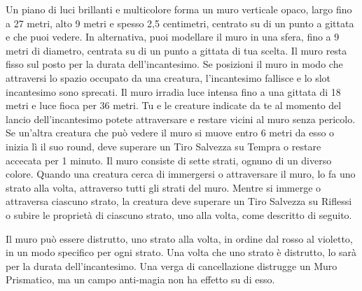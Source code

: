 \begin{multicols}{2}
Un piano di luci brillanti e multicolore forma un muro verticale opaco, largo fino a 27 metri, alto 9 metri e spesso 2,5 centimetri, centrato su di un punto a gittata e che puoi vedere. In alternativa, puoi modellare il muro in una sfera, fino a 9 metri di diametro, centrata su di un punto a gittata di tua scelta. Il muro resta fisso sul posto per la durata dell'incantesimo. Se posizioni il muro in modo che attraversi lo spazio occupato da una creatura, l'incantesimo fallisce e lo slot incantesimo sono sprecati. Il muro irradia luce intensa fino a una gittata di 18 metri e luce fioca per 36 metri. Tu e le creature indicate da te al momento del lancio dell'incantesimo potete attraversare e restare vicini al muro senza pericolo. Se un'altra creatura che può vedere il muro si muove entro 6 metri da esso o inizia lì il suo round, deve superare un Tiro Salvezza su Tempra o restare accecata per 1 minuto. Il muro consiste di sette strati, ognuno di un diverso colore. Quando una creatura cerca di immergersi o attraversare il muro, lo fa uno strato alla volta, attraverso tutti gli strati del muro. Mentre si immerge o attraversa ciascuno strato, la creatura deve superare un Tiro Salvezza su Riflessi o subire le proprietà di ciascuno strato, uno alla volta, come descritto di seguito.

Il muro può essere distrutto, uno strato alla volta, in ordine dal rosso al violetto, in un modo specifico per ogni strato. Una volta che uno strato è distrutto, lo sarà per la durata dell'incantesimo. Una verga di cancellazione distrugge un Muro Prismatico, ma un campo anti-magia non ha effetto su di esso.


\end{multicols}
